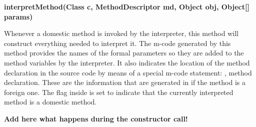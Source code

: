 {\bf{interpretMethod(Class c, MethodDescriptor md, Object obj, Object[] params)}}

Whenever a domestic method is invoked by the interpreter, this
method will construct everything needed to interpret it. The
m-code generated by this method provides the names of the formal
parameters so they are added to the method variables by the \jel{}
interpreter. It also indicates the location of the method
declaration in the source code by means of a special m-code
statement: , method declaration. These are the information
that are generated in  if the method is a
foreign one. The flag inside is set to indicate that the currently
interpreted method is a domestic method.

{\bf Add here what happens during the constructor call!}
